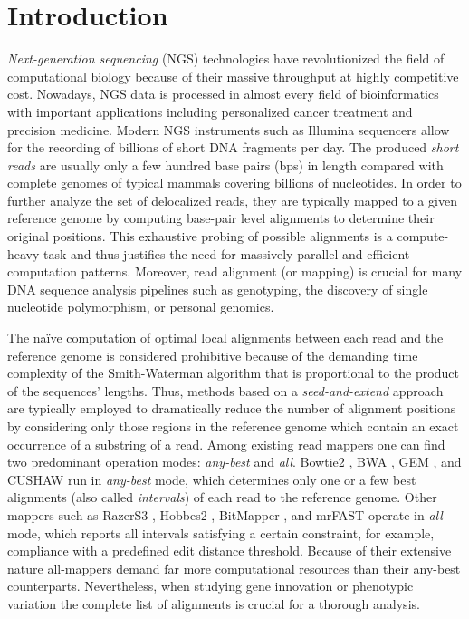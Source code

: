 \documentclass[conference]{IEEEtran}
\begin{document}
\IEEEpeerreviewmaketitle



\section{Introduction}
\label{Introduction}

{\em Next-generation sequencing} (NGS) technologies have
revolutionized the field of computational biology because of their
massive throughput at highly competitive cost. Nowadays, NGS data is
processed in almost every field of bioinformatics with important
applications including personalized cancer treatment and precision
medicine.  Modern NGS instruments such as Illumina sequencers
\cite{reviewngs} allow for the recording of billions of short DNA
fragments per day. The produced \emph{short reads} are usually only a
few hundred base pairs (bps) in length compared with complete genomes
of typical mammals covering billions of nucleotides. In order to
further analyze the set of delocalized reads, they are typically
mapped to a given reference genome by computing base-pair level
alignments to determine their original positions. This exhaustive
probing of possible alignments is a compute-heavy task and thus
justifies the need for massively parallel and efficient computation
patterns. Moreover, read alignment (or mapping) is crucial for many
DNA sequence analysis pipelines such as genotyping, the discovery of
single nucleotide polymorphism, or personal genomics.

The na\"ive computation of optimal local alignments between each read
and the reference genome is considered prohibitive because of the
demanding time complexity of the Smith-Waterman algorithm \cite{sw}
that is proportional to the product of the sequences' lengths. Thus,
methods based on a {\em seed-and-extend} approach are typically
employed to dramatically reduce the number of alignment positions by
considering only those regions in the reference genome which contain
an exact occurrence of a substring of a read. Among existing read
mappers one can find two predominant operation modes: {\em any-best}
and {\em all}. Bowtie2 \cite{bowtie2}, BWA \cite{bwa}, GEM \cite{gem},
and CUSHAW \cite{cushaw} run in {\em any-best} mode, which determines
only one or a few best alignments (also called {\em intervals}) of
each read to the reference genome. Other mappers such as RazerS3
\cite{razers3}, Hobbes2 \cite{hobbes2}, BitMapper \cite{bitmapper},
and mrFAST \cite{mrfast} operate in {\em all} mode, which reports all
intervals satisfying a certain constraint, for example, compliance
with a predefined edit distance threshold.  Because of their extensive
nature all-mappers demand far more computational resources than their
any-best counterparts. Nevertheless, when studying gene innovation or
phenotypic variation the complete list of alignments is crucial for a
thorough analysis.
\end{document}
